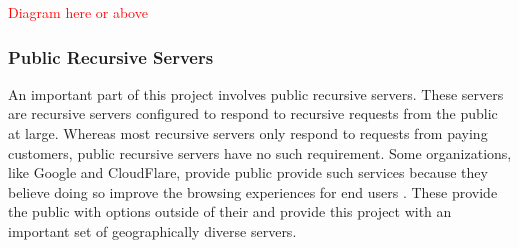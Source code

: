 \textcolor{red}{Diagram here or above} %

\subsubsection{Public Recursive \dns Servers}
An important part of this project involves public recursive \dns servers. These servers are recursive \dns servers configured to respond to recursive requests from the public at large. Whereas most \isp recursive servers only respond to requests from paying customers, public recursive servers have no such requirement. Some organizations, like Google and CloudFlare, provide public \dns provide such services because they believe doing so improve the browsing experiences for end users \cite{GoogleIntroductionDNS}. These provide the public with \dns options outside of their \isp and provide this project with an important set of geographically diverse servers.